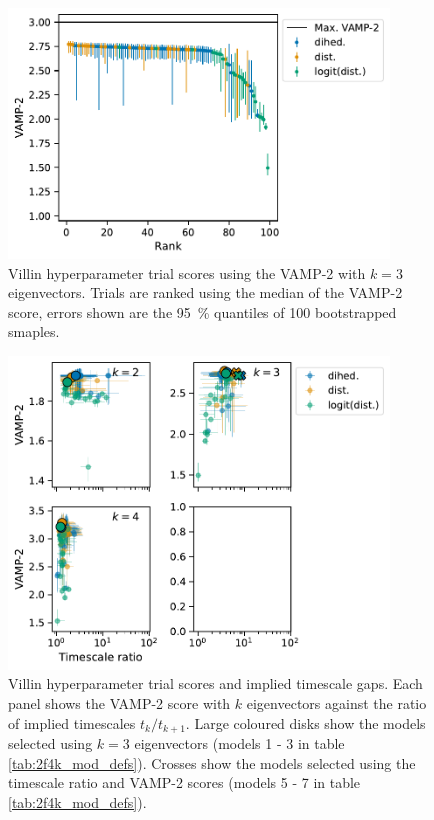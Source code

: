 \documentclass{article}
\begin{document}
\begin{figure}[h]
    \centering
    \includegraphics[width=0.9\textwidth]{figures/vamp_scores/Villin_vamp_scores_ranked.pdf}
    \caption{Villin hyperparameter trial scores using the VAMP-2 with $k=3$ eigenvectors. Trials are ranked using the median of the VAMP-2 score, errors shown are the \SI{95}{\percent} quantiles of 100 bootstrapped smaples.}
    \label{fig:villin_vamp_fixed_k}
\end{figure}

\clearpage
\begin{figure}
    \centering
    \includegraphics[width=0.9\textwidth]{figures/vamp_scores/Villin_vamp_vs_gap.pdf}
    \caption{Villin hyperparameter trial scores and implied timescale gaps.  Each panel shows the VAMP-2 score with $k$ eigenvectors against the ratio of implied timescales $t_{k}/t_{k+1}$. Large coloured disks show the models selected using $k=3$ eigenvectors (models 1 - 3 in table \ref{tab:2f4k_mod_defs}).  Crosses show the models selected using the timescale ratio and VAMP-2 scores (models 5 - 7 in table \ref{tab:2f4k_mod_defs}).}
    \label{fig:villin_vamp_var_k}
\end{figure}
\end{document}
